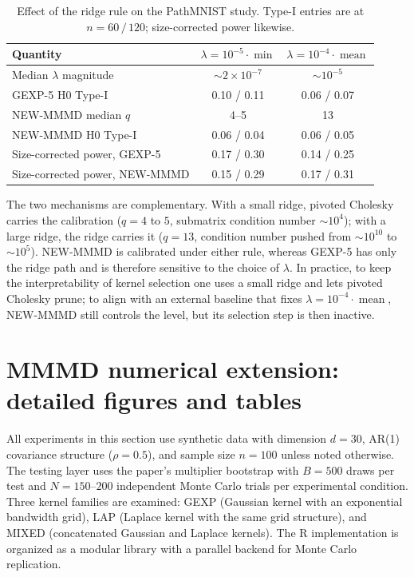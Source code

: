 \documentclass[12pt]{article}
\begin{document}
\begin{table}[H]
\centering
\caption{Effect of the ridge rule on the PathMNIST study. Type-I entries are at $n=60\,/\,120$; size-corrected power likewise.}
\label{tab:app-ridge}
\scriptsize
\begin{tabular}{lcc}
\toprule
Quantity & $\lambda=10^{-5}\cdot\min$ & $\lambda=10^{-4}\cdot\operatorname{mean}$ \\
\midrule
Median $\lambda$ magnitude        & ${\sim}2\times10^{-7}$ & ${\sim}10^{-5}$ \\
GEXP-5 H0 Type-I                   & 0.10 / 0.11 & 0.06 / 0.07 \\
NEW-MMMD median $q$                & 4--5 & 13 \\
NEW-MMMD H0 Type-I                 & 0.06 / 0.04 & 0.06 / 0.05 \\
Size-corrected power, GEXP-5       & 0.17 / 0.30 & 0.14 / 0.25 \\
Size-corrected power, NEW-MMMD     & 0.15 / 0.29 & 0.17 / 0.31 \\
\bottomrule
\end{tabular}
\end{table}

The two mechanisms are complementary. With a small ridge, pivoted Cholesky carries the calibration ($q=4$ to $5$, submatrix condition number ${\sim}10^{4}$); with a large ridge, the ridge carries it ($q=13$, condition number pushed from ${\sim}10^{10}$ to ${\sim}10^{5}$). NEW-MMMD is calibrated under either rule, whereas GEXP-5 has only the ridge path and is therefore sensitive to the choice of $\lambda$. In practice, to keep the interpretability of kernel selection one uses a small ridge and lets pivoted Cholesky prune; to align with an external baseline that fixes $\lambda=10^{-4}\cdot\operatorname{mean}$, NEW-MMMD still controls the level, but its selection step is then inactive.

\clearpage
\section{MMMD numerical extension: detailed figures and tables}
\label{app:numext}

All experiments in this section use synthetic data with dimension $d=30$, AR(1) covariance structure ($\rho=0.5$), and sample size $n=100$ unless noted otherwise. The testing layer uses the paper's multiplier bootstrap with $B=500$ draws per test and $N=150$--$200$ independent Monte Carlo trials per experimental condition. Three kernel families are examined: GEXP (Gaussian kernel with an exponential bandwidth grid), LAP (Laplace kernel with the same grid structure), and MIXED (concatenated Gaussian and Laplace kernels). The R implementation is organized as a modular library with a parallel backend for Monte Carlo replication.
\end{document}
